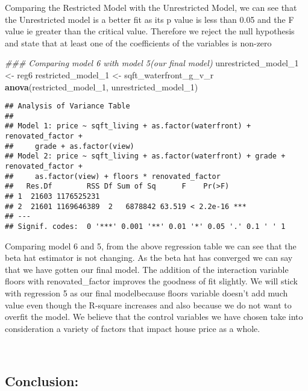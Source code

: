 \documentclass[
]{article}
\newenvironment{Shaded}{\begin{snugshade}}{\end{snugshade}}
\newcommand{\CommentTok}[1]{\textcolor[rgb]{0.56,0.35,0.01}{\textit{#1}}}
\newcommand{\DecValTok}[1]{\textcolor[rgb]{0.00,0.00,0.81}{#1}}
\newcommand{\KeywordTok}[1]{\textcolor[rgb]{0.13,0.29,0.53}{\textbf{#1}}}
\newcommand{\NormalTok}[1]{#1}
\newcommand{\StringTok}[1]{\textcolor[rgb]{0.31,0.60,0.02}{#1}}
\begin{document}
Comparing the Restricted Model with the Unrestricted Model, we can see
that the Unrestricted model is a better fit as its p value is less than
0.05 and the F value ie greater than the critical value. Therefore we
reject the null hypothesis and state that at least one of the
coefficients of the variables is non-zero

\begin{Shaded}
\begin{Highlighting}[]
\CommentTok{### Comparing model 6 with model 5(our final model)}
\NormalTok{unrestricted_model_}\DecValTok{1}\NormalTok{ <-}\StringTok{ }\NormalTok{reg6}
\NormalTok{restricted_model_}\DecValTok{1}\NormalTok{ <-}\StringTok{ }\NormalTok{sqft_waterfront_g_v_r}
\KeywordTok{anova}\NormalTok{(restricted_model_}\DecValTok{1}\NormalTok{, unrestricted_model_}\DecValTok{1}\NormalTok{)}
\end{Highlighting}
\end{Shaded}

\begin{verbatim}
## Analysis of Variance Table
## 
## Model 1: price ~ sqft_living + as.factor(waterfront) + renovated_factor + 
##     grade + as.factor(view)
## Model 2: price ~ sqft_living + as.factor(waterfront) + grade + renovated_factor + 
##     as.factor(view) + floors * renovated_factor
##   Res.Df        RSS Df Sum of Sq      F    Pr(>F)    
## 1  21603 1176525231                                  
## 2  21601 1169646389  2   6878842 63.519 < 2.2e-16 ***
## ---
## Signif. codes:  0 '***' 0.001 '**' 0.01 '*' 0.05 '.' 0.1 ' ' 1
\end{verbatim}

Comparing model 6 and 5, from the above regression table we can see that
the beta hat estimator is not changing. As the beta hat has converged we
can say that we have gotten our final model. The addition of the
interaction variable floors with renovated\_factor improves the goodness
of fit slightly. We will stick with regression 5 as our final
modelbecause floors variable doesn't add much value even though the
R-square increases and also because we do not want to overfit the model.
We believe that the control variables we have chosen take into
consideration a variety of factors that impact house price as a whole.

~

\hypertarget{conclusion}{%
\subsection{Conclusion:}\label{conclusion}}
\end{document}
